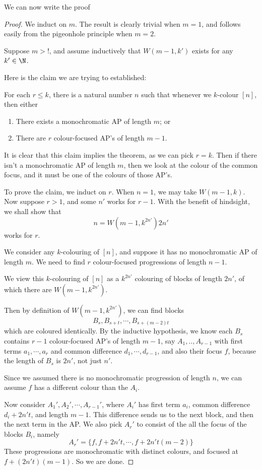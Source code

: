 \documentclass[a4paper]{article}
\begin{document}
We can now write the proof
\begin{proof}
  We induct on $m$. The result is clearly trivial when $m = 1$, and follows easily from the pigeonhole principle when $m = 2$.

  Suppose $m > !$, and assume inductively that $W(m - 1, k')$ exists for any $k' \in \N$.

  Here is the claim we are trying to established:
  \begin{claim}
    For each $r \leq k$, there is a natural number $n$ such that whenever we $k$-colour $[n]$, then either
    \begin{enumerate}
      \item There exists a monochromatic AP of length $m$; or
      \item There are $r$ colour-focused AP's of length $m - 1$.
    \end{enumerate}
  \end{claim}
  It is clear that this claim implies the theorem, as we can pick $r = k$. Then if there isn't a monochromatic AP of length $m$, then we look at the colour of the common focus, and it must be one of the colours of those AP's.

  To prove the claim, we induct on $r$. When $n = 1$, we may take $W(m - 1, k)$. Now suppose $r > 1$, and some $n'$ works for $r - 1$. With the benefit of hindsight, we shall show that
  \[
    n = W(m - 1, k^{2n'}) 2n'
  \]
  works for $r$.

  We consider any $k$-colouring of $[n]$, and suppose it has no monochromatic AP of length $m$. We need to find $r$ colour-focused progressions of length $n - 1$.

  We view this $k$-colouring of $[n]$ as a $k^{2n'}$ colouring of blocks of length $2n'$, of which there are $W(m - 1, k^{2n'})$.

  Then by definition of $W(m - 1, k^{2n'})$, we can find blocks
  \[
    B_s, B_{s + t}, \cdots, B_{s + (m - 2)t}
  \]
  which are coloured identically. By the inductive hypothesis, we know each $B_s$ contains $r - 1$ colour-focused AP's of length $m - 1$, say $A_1, .., A_{r - 1}$ with first terms $a_1, \cdots, a_r$ and common difference $d_1 , \cdots, d_{r - 1}$, and also their focus $f$, because the length of $B_s$ is $2n'$, not just $n'$.

  Since we assumed there is no monochromatic progression of length $n$, we can assume $f$ has a different colour than the $A_i$.

  Now consider $A_1', A_2', \cdots, A_{r - 1}'$, where $A_i'$ has first term $a_i$, common difference $d_i + 2n't$, and length $m - 1$. This difference sends us to the next block, and then the next term in the AP. We also pick $A_r'$ to consist of the all the focus of the blocks $B_i$, namely
  \[
    A_r' = \{f, f + 2n't, \cdots, f + 2n't(m - 2)\}
  \]
  These progressions are monochromatic with distinct colours, and focused at $f + (2n' t)(m - 1)$. So we are done.
\end{proof}
\end{document}
